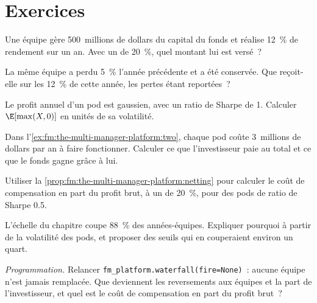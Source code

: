 \section{Exercices}

\begin{exercise}[$\star$]\label{exo:fm:the-multi-manager-platform:1}
Une équipe gère 500~millions de dollars du capital du fonds et réalise 12~\% de rendement sur un an. Avec un  de 20~\%, quel montant lui est versé~?
\end{exercise}

\begin{exercise}[$\star$]\label{exo:fm:the-multi-manager-platform:2}
La même équipe a perdu 5~\% l'année précédente et a été conservée. Que reçoit-elle sur les 12~\% de cette année, les pertes étant reportées~?
\end{exercise}

\begin{exercise}[$\star$]\label{exo:fm:the-multi-manager-platform:3}
Le profit annuel d'un pod est gaussien, avec un ratio de Sharpe de 1. Calculer $\E[\max(X,0)]$ en unités de sa volatilité.
\end{exercise}

\begin{exercise}[$\star\star$]\label{exo:fm:the-multi-manager-platform:4}
Dans l'\cref{ex:fm:the-multi-manager-platform:two}, chaque pod coûte 3~millions de dollars par an à faire fonctionner. Calculer ce que l'investisseur paie au total et ce que
le fonds gagne grâce à lui.
\end{exercise}

\begin{exercise}[$\star\star$]\label{exo:fm:the-multi-manager-platform:5}
Utiliser la \cref{prop:fm:the-multi-manager-platform:netting} pour calculer le coût de compensation en part du profit brut, à un  de 20~\%, pour des pods de
ratio de Sharpe 0.5.
\end{exercise}

\begin{exercise}[$\star\star$]\label{exo:fm:the-multi-manager-platform:6}
L'échelle du chapitre coupe 88~\% des années-équipes. Expliquer pourquoi à partir de la volatilité des pods, et proposer des seuils qui en couperaient environ un quart.
\end{exercise}

\begin{exercise}[$\star\star\star$]\label{exo:fm:the-multi-manager-platform:7}
\emph{Programmation.} Relancer \texttt{fm\_platform.waterfall(fire=None)}~: aucune équipe n'est jamais remplacée. Que deviennent les reversements aux équipes et la part de l'investisseur,
et quel est le coût de compensation en part du profit brut~?
\end{exercise}

